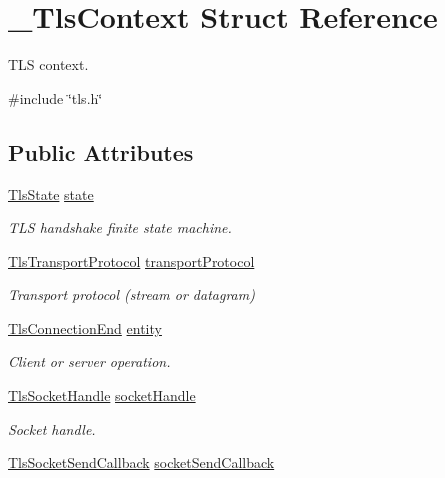 \hypertarget{struct__TlsContext}{}\section{\+\_\+\+Tls\+Context Struct Reference}
\label{struct__TlsContext}


T\+LS context.  




{\ttfamily \#include \char`\"{}tls.\+h\char`\"{}}

\subsection*{Public Attributes}
\begin{DoxyCompactItemize}
\item 
\hyperlink{tls_8h_a02bb4c8aa7988b33fe4d4836d8ff4a4d}{Tls\+State} \hyperlink{struct__TlsContext_a5610d9db8b1a8cd1c32e3aae456be72b}{state}
\begin{DoxyCompactList}\small\item\em T\+LS handshake finite state machine. \end{DoxyCompactList}\item 
\hyperlink{tls_8h_a25cb7e3df9004160eb21eac9377dc89f}{Tls\+Transport\+Protocol} \hyperlink{struct__TlsContext_ad7b069461b31df5cc25d98ea65147000}{transport\+Protocol}
\begin{DoxyCompactList}\small\item\em Transport protocol (stream or datagram) \end{DoxyCompactList}\item 
\hyperlink{tls_8h_acb21bc158664d823d899d760edd8135b}{Tls\+Connection\+End} \hyperlink{struct__TlsContext_a9cb3b22d9fe0de7314d33ca6caba5d42}{entity}
\begin{DoxyCompactList}\small\item\em Client or server operation. \end{DoxyCompactList}\item 
\hyperlink{tls_8h_a55c0b32d3441cc70d62c51951ccaaa4e}{Tls\+Socket\+Handle} \hyperlink{struct__TlsContext_a24c3e8a0d8a4d920767b1d76927bd670}{socket\+Handle}
\begin{DoxyCompactList}\small\item\em Socket handle. \end{DoxyCompactList}\item 
\hyperlink{tls_8h_a2d3369746cfcc1ff0830302cecea54ce}{Tls\+Socket\+Send\+Callback} \hyperlink{struct__TlsContext_aaea9cdf8a35e56cdc94457ed81f8843a}{socket\+Send\+Callback}

\end{DoxyCompactItemize}
